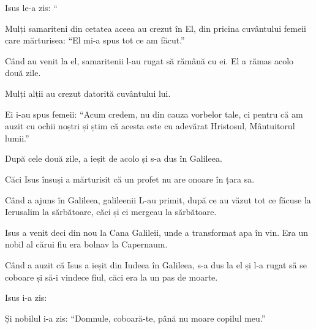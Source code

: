 {\par }{\PP {}Isus le-a zis: “{}






\par }{\PP {}Mulți samariteni din cetatea aceea au crezut în El, din pricina cuvântului femeii care mărturisea: “El mi-a spus tot ce am făcut.”

Când au venit la el, samaritenii l-au rugat să rămână cu ei. El a rămas acolo două zile.

Mulți alții au crezut datorită cuvântului lui.

Ei i-au spus femeii: “Acum credem, nu din cauza vorbelor tale, ci pentru că am auzit cu ochii noștri și știm că acesta este cu adevărat Hristosul, Mântuitorul lumii.”


\par }{\PP {}După cele două zile, a ieșit de acolo și s-a dus în Galileea.

Căci Isus însuși a mărturisit că un profet nu are onoare în țara sa.

Când a ajuns în Galileea, galileenii L-au primit, după ce au văzut tot ce făcuse la Ierusalim la sărbătoare, căci și ei mergeau la sărbătoare.

Isus a venit deci din nou la Cana Galileii, unde a transformat apa în vin. Era un nobil al cărui fiu era bolnav la Capernaum.

Când a auzit că Isus a ieșit din Iudeea în Galileea, s-a dus la el și l-a rugat să se coboare și să-i vindece fiul, căci era la un pas de moarte.

Isus i-a zis:
{}


\par }{\PP {}Și nobilul i-a zis: “Domnule, coboară-te, până nu moare copilul meu.”


}

